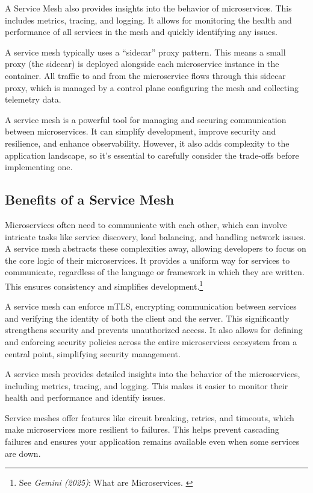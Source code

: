 A Service Mesh also provides insights into the behavior of
microservices. This includes metrics, tracing, and logging. It allows
for monitoring the health and performance of all services in the mesh
and quickly identifying any issues.

A service mesh typically uses a ``sidecar'' proxy pattern. This means a
small proxy (the sidecar) is deployed alongside each microservice
instance in the container. All traffic to and from the microservice
flows through this sidecar proxy, which is managed by a control plane
configuring the mesh and collecting telemetry data.

A service mesh is a powerful tool for managing and securing
communication between microservices. It can simplify development,
improve security and resilience, and enhance observability. However, it
also adds complexity to the application landscape, so it's essential to
carefully consider the trade-offs before implementing one.

\subsection{Benefits of a Service Mesh}

Microservices often need to communicate with each other, which can
involve intricate tasks like service discovery, load balancing, and
handling network issues. A service mesh abstracts these complexities
away, allowing developers to focus on the core logic of their
microservices. It provides a uniform way for services to communicate,
regardless of the language or framework in which they are written. This
ensures consistency and simplifies development.\footnote{See \textit{Gemini (2025)}: What are Microservices. \cite{bardLinkerd}}

A service mesh can enforce mTLS, encrypting communication between
services and verifying the identity of both the client and the server.
This significantly strengthens security and prevents unauthorized
access. It also allows for defining and enforcing security policies
across the entire microservices ecosystem from a central point,
simplifying security management.

A service mesh provides detailed insights into the behavior of the
microservices, including metrics, tracing, and logging. This makes it
easier to monitor their health and performance and identify issues.

Service meshes offer features like circuit breaking, retries, and
timeouts, which make microservices more resilient to failures. This
helps prevent cascading failures and ensures your application remains
available even when some services are down.

